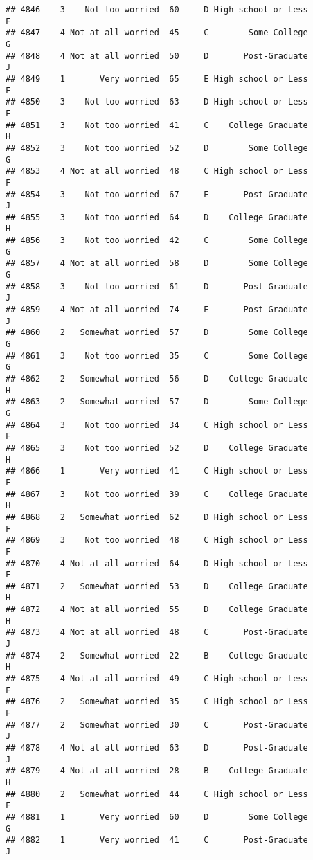 \documentclass[
]{article}
\begin{document}
\begin{verbatim}
## 4846    3    Not too worried  60     D High school or Less         F
## 4847    4 Not at all worried  45     C        Some College         G
## 4848    4 Not at all worried  50     D       Post-Graduate         J
## 4849    1       Very worried  65     E High school or Less         F
## 4850    3    Not too worried  63     D High school or Less         F
## 4851    3    Not too worried  41     C    College Graduate         H
## 4852    3    Not too worried  52     D        Some College         G
## 4853    4 Not at all worried  48     C High school or Less         F
## 4854    3    Not too worried  67     E       Post-Graduate         J
## 4855    3    Not too worried  64     D    College Graduate         H
## 4856    3    Not too worried  42     C        Some College         G
## 4857    4 Not at all worried  58     D        Some College         G
## 4858    3    Not too worried  61     D       Post-Graduate         J
## 4859    4 Not at all worried  74     E       Post-Graduate         J
## 4860    2   Somewhat worried  57     D        Some College         G
## 4861    3    Not too worried  35     C        Some College         G
## 4862    2   Somewhat worried  56     D    College Graduate         H
## 4863    2   Somewhat worried  57     D        Some College         G
## 4864    3    Not too worried  34     C High school or Less         F
## 4865    3    Not too worried  52     D    College Graduate         H
## 4866    1       Very worried  41     C High school or Less         F
## 4867    3    Not too worried  39     C    College Graduate         H
## 4868    2   Somewhat worried  62     D High school or Less         F
## 4869    3    Not too worried  48     C High school or Less         F
## 4870    4 Not at all worried  64     D High school or Less         F
## 4871    2   Somewhat worried  53     D    College Graduate         H
## 4872    4 Not at all worried  55     D    College Graduate         H
## 4873    4 Not at all worried  48     C       Post-Graduate         J
## 4874    2   Somewhat worried  22     B    College Graduate         H
## 4875    4 Not at all worried  49     C High school or Less         F
## 4876    2   Somewhat worried  35     C High school or Less         F
## 4877    2   Somewhat worried  30     C       Post-Graduate         J
## 4878    4 Not at all worried  63     D       Post-Graduate         J
## 4879    4 Not at all worried  28     B    College Graduate         H
## 4880    2   Somewhat worried  44     C High school or Less         F
## 4881    1       Very worried  60     D        Some College         G
## 4882    1       Very worried  41     C       Post-Graduate         J

\end{verbatim}
\end{document}
